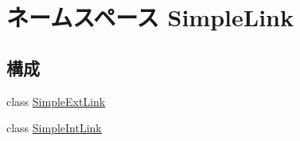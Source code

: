 \hypertarget{namespaceSimpleLink}{
\section{ネームスペース SimpleLink}
\label{namespaceSimpleLink}
}
\subsection*{構成}
\begin{DoxyCompactItemize}
\item 
class \hyperlink{classSimpleLink_1_1SimpleExtLink}{SimpleExtLink}
\item 
class \hyperlink{classSimpleLink_1_1SimpleIntLink}{SimpleIntLink}
\end{DoxyCompactItemize}
